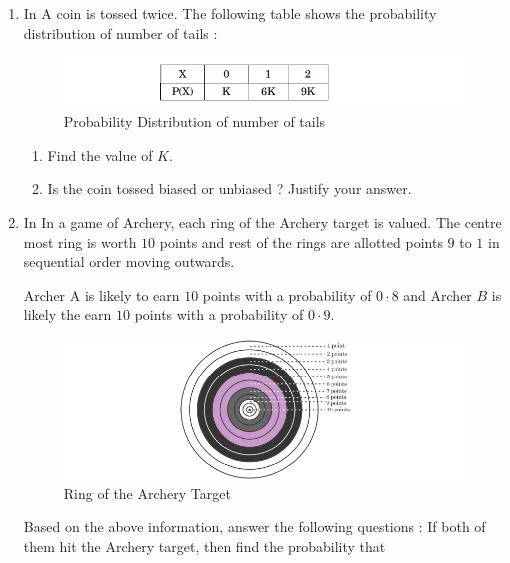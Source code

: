 \begin{enumerate}[label=\thesection.\arabic*.,ref=\thesection.\theenumi]
\item In  A coin is tossed twice. The following table shows the probability 
distribution of number of tails :
\begin{figure}[H]
        \centering
        \includegraphics[width=\columnwidth]{./figs/Screenshot (28).png}
        \caption{Probability Distribution of number of tails}
        \label{fig:2022/probability/fig3.png}
    \end{figure}

    \begin{enumerate}[label=(\alph*)]
    
 \item  Find the value of $K$. 
 
 \item  Is the coin tossed biased or unbiased ? Justify your answer.

\end{enumerate}

\item In  In a game of Archery, each ring of the Archery target is valued. The 
centre most ring is worth $10$ points and rest of the rings are allotted 
points $9$ to $1$ in sequential order moving outwards.

Archer A is likely to earn $10$ points with a probability of $0·8$ and Archer $B$ 
is likely the earn $10$ points with a probability of $0·9$.

\begin{figure}[H]
        \centering
        \includegraphics[width=\columnwidth]{./figs/Screenshot (26).png}
        \caption{Ring of the Archery Target}
        \label{fig:2022/probability/fig4.png}
    \end{figure}

Based on the above information, answer the following questions : 
If both of them hit the Archery target, then find the probability that 


\end{enumerate}
